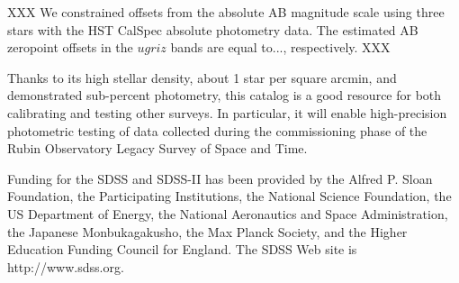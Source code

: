 \documentclass{aastex63}
\begin{document}
XXX We constrained offsets from the absolute AB magnitude scale using three stars with 
the HST CalSpec absolute photometry data. The estimated AB zeropoint offsets in the $ugriz$ bands
are equal to..., respectively. XXX

Thanks to its high stellar density, about 1 star per square arcmin, and demonstrated sub-percent 
photometry, this catalog is a good resource for both calibrating and testing other surveys. In
particular, it will enable high-precision photometric testing of data collected during the 
commissioning phase of the Rubin Observatory Legacy Survey of Space and Time. 
  

\acknowledgments
Funding for the SDSS and SDSS-II has been provided by the Alfred P. Sloan Foundation, the Participating
Institutions, the National Science Foundation, the US Department of Energy, the National Aeronautics and 
Space Administration, the Japanese Monbukagakusho, the Max Planck Society, and the Higher Education 
Funding Council for England. The SDSS Web site is http://www.sdss.org.
 
\vspace{5mm}


{}


%
 
\end{document}

